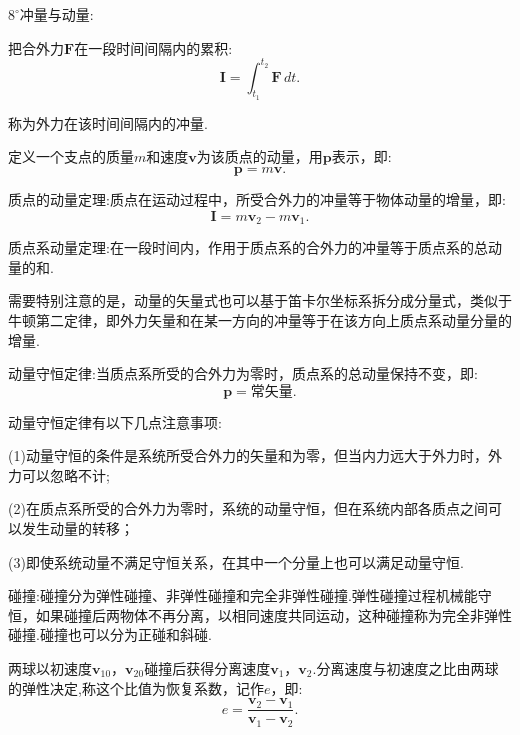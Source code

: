 \documentclass[UTF8]{ctexart}
\begin{document}
	$8^{\circ}$冲量与动量: 

	把合外力${\boldsymbol F}$在一段时间间隔内的累积:
	\begin{equation*}
		{\boldsymbol I}=\int_{t_1}^{t_2}{\boldsymbol F}\,dt.
	\end{equation*}
	
	称为外力在该时间间隔内的冲量.

	定义一个支点的质量$m$和速度${\boldsymbol v}$为该质点的动量，用${\boldsymbol p}$表示，即:
	\begin{equation*}
		{\boldsymbol p}=m{\boldsymbol v}.
	\end{equation*}

	质点的动量定理:质点在运动过程中，所受合外力的冲量等于物体动量的增量，即:
	\begin{equation*}
		{\boldsymbol I}=m{\boldsymbol v}_2-m{\boldsymbol v}_1.
	\end{equation*}

	质点系动量定理:在一段时间内，作用于质点系的合外力的冲量等于质点系的总动量的和.

	需要特别注意的是，动量的矢量式也可以基于笛卡尔坐标系拆分成分量式，类似于牛顿第二定律，即外力矢量和在某一方向的冲量等于在该方向上质点系动量分量的增量.

	动量守恒定律:当质点系所受的合外力为零时，质点系的总动量保持不变，即:
	\begin{equation*}
		{\boldsymbol p}=\text{常矢量}.
	\end{equation*}	

	动量守恒定律有以下几点注意事项:

	(1)动量守恒的条件是系统所受合外力的矢量和为零，但当内力远大于外力时，外力可以忽略不计;

	(2)在质点系所受的合外力为零时，系统的动量守恒，但在系统内部各质点之间可以发生动量的转移；

	(3)即使系统动量不满足守恒关系，在其中一个分量上也可以满足动量守恒.

	碰撞:碰撞分为弹性碰撞、非弹性碰撞和完全非弹性碰撞.弹性碰撞过程机械能守恒，如果碰撞后两物体不再分离，以相同速度共同运动，这种碰撞称为完全非弹性碰撞.碰撞也可以分为正碰和斜碰.

	两球以初速度${\boldsymbol v}_{10}$，${\boldsymbol v}_{20}$碰撞后获得分离速度${\boldsymbol v}_{1}$，${\boldsymbol v}_{2}$.分离速度与初速度之比由两球的弹性决定,称这个比值为恢复系数，记作$e$，即:
	\begin{equation*}
		e=\frac{{\boldsymbol v}_{2}-{\boldsymbol v}_{1}}{{\boldsymbol v}_{1}-{\boldsymbol v}_{2}}.
	\end{equation*}
\end{document}
